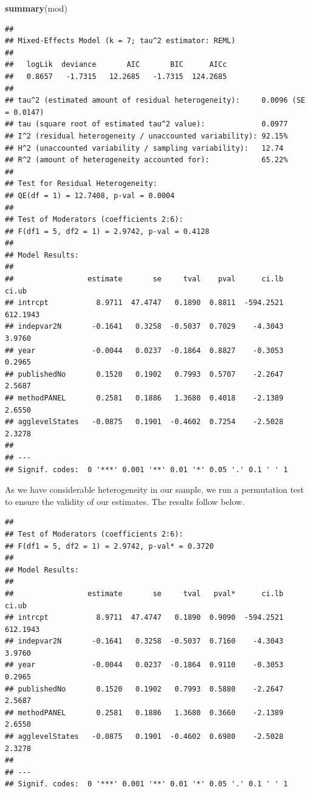 \documentclass[
]{article}
\newenvironment{Shaded}{\begin{snugshade}}{\end{snugshade}}
\newcommand{\KeywordTok}[1]{\textcolor[rgb]{0.13,0.29,0.53}{\textbf{#1}}}
\newcommand{\NormalTok}[1]{#1}
\begin{document}
\begin{Shaded}
\begin{Highlighting}[]
\KeywordTok{summary}\NormalTok{(mod)}
\end{Highlighting}
\end{Shaded}

\begin{verbatim}
## 
## Mixed-Effects Model (k = 7; tau^2 estimator: REML)
## 
##   logLik  deviance       AIC       BIC      AICc 
##   0.8657   -1.7315   12.2685   -1.7315  124.2685   
## 
## tau^2 (estimated amount of residual heterogeneity):     0.0096 (SE = 0.0147)
## tau (square root of estimated tau^2 value):             0.0977
## I^2 (residual heterogeneity / unaccounted variability): 92.15%
## H^2 (unaccounted variability / sampling variability):   12.74
## R^2 (amount of heterogeneity accounted for):            65.22%
## 
## Test for Residual Heterogeneity:
## QE(df = 1) = 12.7408, p-val = 0.0004
## 
## Test of Moderators (coefficients 2:6):
## F(df1 = 5, df2 = 1) = 2.9742, p-val = 0.4128
## 
## Model Results:
## 
##                 estimate       se     tval    pval      ci.lb     ci.ub 
## intrcpt           8.9711  47.4747   0.1890  0.8811  -594.2521  612.1943    
## indepvar2N       -0.1641   0.3258  -0.5037  0.7029    -4.3043    3.9760    
## year             -0.0044   0.0237  -0.1864  0.8827    -0.3053    0.2965    
## publishedNo       0.1520   0.1902   0.7993  0.5707    -2.2647    2.5687    
## methodPANEL       0.2581   0.1886   1.3680  0.4018    -2.1389    2.6550    
## agglevelStates   -0.0875   0.1901  -0.4602  0.7254    -2.5028    2.3278    
## 
## ---
## Signif. codes:  0 '***' 0.001 '**' 0.01 '*' 0.05 '.' 0.1 ' ' 1
\end{verbatim}

As we have considerable heterogeneity in our sample, we run a
permutation test to ensure the validity of our estimates. The results
follow below.

\begin{verbatim}
## 
## Test of Moderators (coefficients 2:6):
## F(df1 = 5, df2 = 1) = 2.9742, p-val* = 0.3720
## 
## Model Results:
## 
##                 estimate       se     tval   pval*      ci.lb     ci.ub 
## intrcpt           8.9711  47.4747   0.1890  0.9090  -594.2521  612.1943    
## indepvar2N       -0.1641   0.3258  -0.5037  0.7160    -4.3043    3.9760    
## year             -0.0044   0.0237  -0.1864  0.9110    -0.3053    0.2965    
## publishedNo       0.1520   0.1902   0.7993  0.5880    -2.2647    2.5687    
## methodPANEL       0.2581   0.1886   1.3680  0.3660    -2.1389    2.6550    
## agglevelStates   -0.0875   0.1901  -0.4602  0.6980    -2.5028    2.3278    
## 
## ---
## Signif. codes:  0 '***' 0.001 '**' 0.01 '*' 0.05 '.' 0.1 ' ' 1
\end{verbatim}
\end{document}

